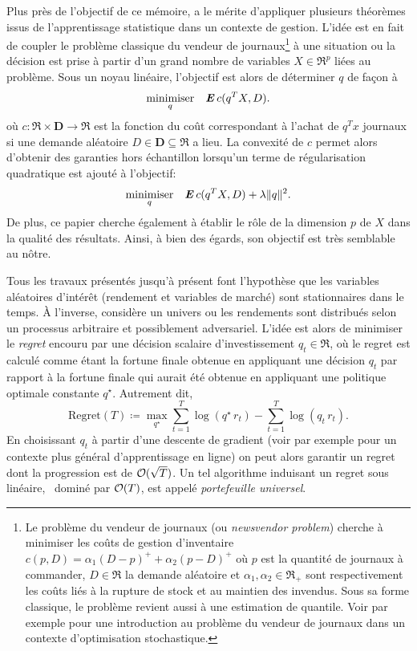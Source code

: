 Plus près de l'objectif de ce mémoire, \cite{rudin2014big} a le mérite d'appliquer
plusieurs théorèmes issus de l'apprentissage statistique dans un contexte de
gestion. L'idée est en fait de coupler le problème classique du vendeur de
journaux\footnote{Le problème du vendeur de journaux (ou \textsl{newsvendor problem})
  cherche à minimiser les coûts de gestion d'inventaire
  $c(p,D) = \alpha_1(D-p)^+ + \alpha_2(p-D)^+$ où $p$ est la quantité de journaux à commander,
  $D \in \Re$ la demande aléatoire et $\alpha_1,\alpha_2 \in \Re_+$ sont respectivement les coûts liés à la
  rupture de stock et au maintien des invendus. Sous sa forme classique, le problème
  revient aussi à une estimation de quantile. Voir par exemple \cite{shapiro2009lectures}
  pour une introduction au problème du vendeur de journaux dans un contexte d'optimisation
  stochastique.} à une situation ou la décision est prise à partir d'un grand nombre de
variables $X \in \Re^p$ liées au problème. Sous un noyau linéaire, l'objectif est alors de
déterminer $q$ de façon à
\begin{equation}
  \minimizeEquation[q]{\E c(q^TX,D).}
\end{equation}
où $c:\Re\times\bm{D}\to\Re$ est la fonction du coût correspondant à l'achat de $q^Tx$ journaux si
une demande aléatoire $D \in \bm{D} \subseteq \Re$ a lieu. La convexité de $c$ permet alors d'obtenir
des garanties hors échantillon lorsqu'un terme de régularisation quadratique est ajouté à
l'objectif:
\begin{equation}
  \minimizeEquation[q]{\E c(q^TX,D) + \lambda\|q\|^2.}
\end{equation}
De plus, ce papier cherche également à établir le rôle de la dimension $p$ de $X$ dans la
qualité des résultats. Ainsi, à bien des égards, son objectif est très semblable au
nôtre. 

Tous les travaux présentés jusqu'à présent font l'hypothèse que les variables aléatoires
d'intérêt (rendement et variables de marché) sont stationnaires dans le temps. À
l'inverse, \cite{cover1991universal} considère un univers ou les rendements sont
distribués selon un processus arbitraire et possiblement adversariel. L'idée est alors de
minimiser le \textit{regret} encouru par une décision scalaire d'investissement
$q_t \in \Re$, où le regret est calculé comme étant la fortune finale obtenue en appliquant
une décision $q_t$ par rapport à la fortune finale qui aurait été obtenue en
appliquant une politique optimale constante $q^\star$. Autrement dit,
\begin{equation}
  \text{Regret}(T) \coloneqq \max_{q^\star}\sum_{t=1}^T \log(q^\star\,r_t) - \sum_{t=1}^T \log(q_t\,r_t).
\end{equation}
En choisissant $q_t$ à partir d'une descente de gradient (voir par exemple
\cite{hazan2015online} pour un contexte plus général d'apprentissage en ligne) on peut
alors garantir un regret dont la progression est de $\bigO(\sqrt{T})$. Un tel algorithme
induisant un regret sous linéaire, \ie\ dominé par $\bigO(T)$, est appelé
\textit{portefeuille universel}.

